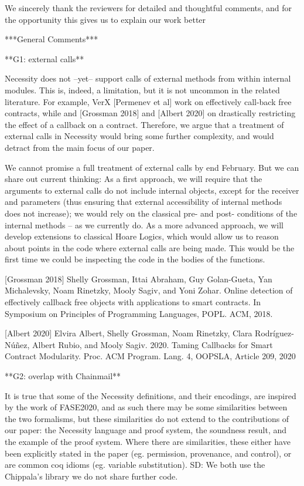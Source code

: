 We sincerely thank the reviewers for detailed and thoughtful comments, and for the opportunity this gives us to explain our work better

***General Comments***

**G1: external calls**

Necessity does not --yet-- support calls of external methods from within internal modules. This is, indeed, a limitation, but it is not uncommon in the related literature. For example, VerX [Permenev et al] work on effectively call-back free contracts, while and [Grossman 2018] and  [Albert 2020] on drastically restricting the effect of a callback on a contract. Therefore, we argue that a treatment of  external calls in Necessity would bring some further complexity, and would  detract from the main focus of our paper.  

We cannot promise a full treatment of external calls by end February. But we can share out current thinking:  As a first approach, we will require that the arguments to external calls do not include internal objects, except for the receiver and parameters (thus ensuring that external accessibility of internal methods does not increase); we would rely on the classical pre- and post- conditions of the internal methods -- as we currently do. As a more advanced approach, we will develop extensions to classical Hoare Logics, which would allow us to reason about points in the code where external calls are being made. This would be the first time we could be inspecting the code in the bodies of the functions.

[Grossman 2018] Shelly Grossman, Ittai Abraham, Guy Golan-Gueta, Yan Michalevsky, Noam Rinetzky, Mooly Sagiv, and Yoni Zohar. Online detection of effectively callback free objects with applications to smart contracts. In Symposium on Principles of Programming Languages, POPL. ACM, 2018.

[Albert 2020] Elvira Albert, Shelly Grossman, Noam Rinetzky, Clara Rodríguez-Núñez, Albert Rubio, and Mooly Sagiv. 2020. Taming Callbacks for Smart Contract Modularity. Proc. ACM Program. Lang. 4, OOPSLA, Article 209, 2020


**G2:  overlap with Chainmail**

It is true that some of the Necessity definitions, and their encodings, are inspired by the work of FASE2020, 
and as such there may be some similarities between the two formalisms, but these similarities do not extend to the contributions of our paper: the Necessity language and proof system, 
the soundness result, and the example of the proof system. Where there are similarities, these either have been explicitly stated in the paper (eg. permission, provenance, and control),
or are common coq idioms (eg. variable substitution).
SD: We both use the Chippala's library we do not share further code. 


